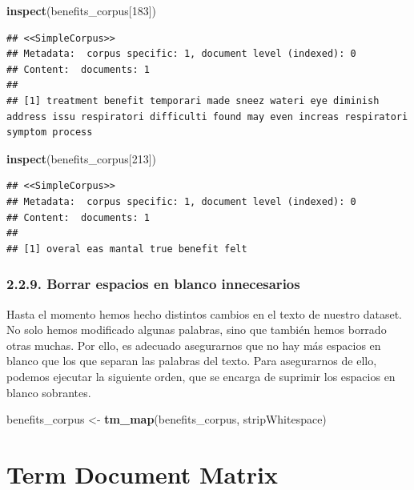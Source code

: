 \documentclass[spanish,]{article}
\newenvironment{Shaded}{\begin{snugshade}}{\end{snugshade}}
\newcommand{\KeywordTok}[1]{\textcolor[rgb]{0.13,0.29,0.53}{\textbf{#1}}}
\newcommand{\DecValTok}[1]{\textcolor[rgb]{0.00,0.00,0.81}{#1}}
\newcommand{\StringTok}[1]{\textcolor[rgb]{0.31,0.60,0.02}{#1}}
\newcommand{\NormalTok}[1]{#1}
\begin{document}
\begin{Shaded}
\begin{Highlighting}[]
\KeywordTok{inspect}\NormalTok{(benefits_corpus[}\DecValTok{183}\NormalTok{])}
\end{Highlighting}
\end{Shaded}

\begin{verbatim}
## <<SimpleCorpus>>
## Metadata:  corpus specific: 1, document level (indexed): 0
## Content:  documents: 1
## 
## [1] treatment benefit temporari made sneez wateri eye diminish address issu respiratori difficulti found may even increas respiratori symptom process
\end{verbatim}

\begin{Shaded}
\begin{Highlighting}[]
\KeywordTok{inspect}\NormalTok{(benefits_corpus[}\DecValTok{213}\NormalTok{])}
\end{Highlighting}
\end{Shaded}

\begin{verbatim}
## <<SimpleCorpus>>
## Metadata:  corpus specific: 1, document level (indexed): 0
## Content:  documents: 1
## 
## [1] overal eas mantal true benefit felt
\end{verbatim}

\subsubsection{2.2.9. Borrar espacios en blanco
innecesarios}\label{borrar-espacios-en-blanco-innecesarios}

Hasta el momento hemos hecho distintos cambios en el texto de nuestro
dataset. No solo hemos modificado algunas palabras, sino que también
hemos borrado otras muchas. Por ello, es adecuado asegurarnos que no hay
más espacios en blanco que los que separan las palabras del texto. Para
asegurarnos de ello, podemos ejecutar la siguiente orden, que se encarga
de suprimir los espacios en blanco sobrantes.

\begin{Shaded}
\begin{Highlighting}[]
\NormalTok{benefits_corpus <-}\StringTok{ }\KeywordTok{tm_map}\NormalTok{(benefits_corpus, stripWhitespace) }
\end{Highlighting}
\end{Shaded}

\section{Term Document Matrix}\label{term-document-matrix}
\end{document}
